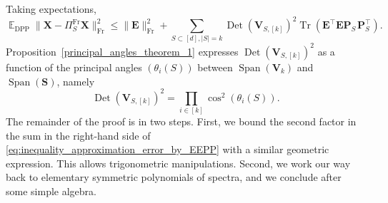 \documentclass[twoside,11pt]{book}
\numberwithin{theorem}{chapter}
\numberwithin{definition}{chapter}
\numberwithin{proposition}{chapter}
\numberwithin{corollary}{chapter}
\numberwithin{example}{chapter}
\numberwithin{lemma}{chapter}
\numberwithin{assumption}{chapter}
\numberwithin{equation}{chapter}
\numberwithin{figure}{chapter}
\DeclareMathOperator{\Tr}{Tr}
\DeclareMathOperator{\Det}{Det}
\DeclareMathOperator{\Span}{\mathrm{Span}}
\DeclareMathOperator{\Fr}{\mathrm{Fr}}
\DeclareMathOperator{\DPP}{\mathrm{DPP}}
\DeclareMathOperator{\Tran}{\intercal}
\DeclareMathOperator{\EX}{\mathbb{E}}
\begin{document}
Taking expectations,
\begin{equation}
  \label{eq:inequality_approximation_error_by_EEPP}
		\EX_{\DPP} \| \bm{X} - \Pi_{S}^{\Fr}\bm{X} \|_{\Fr}^{2} \leq \|\bm{E}\|_{\Fr}^{2} + \sum_{S \subset [d], |S| = k}	\Det(\bm{V}_{S,[k]})^{2} \Tr(\bm{E}^{\Tran}\bm{E}\bm{P}^{\phantom{\Tran}}_{S}\bm{P}^{\Tran}_{S}).
\end{equation}
Proposition~\ref{principal_angles_theorem_1} expresses $\Det(\bm{V}_{S,[k]})^{2}$ as a function of the principal angles $(\theta_i(S))$ between $\Span(\bm{V}_k)$ and $\Span(\bm{S})$, namely
\begin{equation}\label{eq:det_cos_identity}
	\Det(\bm{V}_{S,[k]})^{2} = \prod\limits_{i \in [k]} \cos^{2}(\theta_{i}(S)).
\end{equation}
 The remainder of the proof is in two steps. First, we bound the second factor in the sum in the right-hand side of \eqref{eq:inequality_approximation_error_by_EEPP} with a similar geometric expression. This allows trigonometric manipulations. Second, we work our way back to elementary symmetric polynomials of spectra, and we conclude after some simple algebra.
\end{document}
